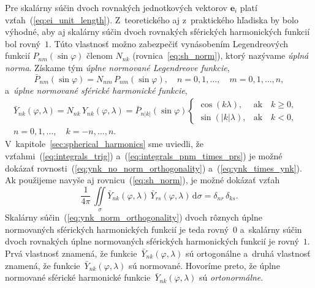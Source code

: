 \documentclass[a4paper, 12pt]{book}
\newcommand{\diff}{\mathrm d}
\let\vec\mathbf
\begin{document}
Pre skalárny súčin dvoch rovnakých jednotkových vektorov $\vec e_i$ platí 
vzťah~(\ref{eq:ei_unit_length}).  Z~teoretického aj z~praktického hľadiska by 
bolo výhodné, aby aj skalárny súčin dvoch rovnakých sférických harmonických 
funkcií bol rovný~$1$.  Túto vlastnosť možno zabezpečiť vynásobením 
Legendreových funkcií $P_{nm}(\sin\varphi)$ členom $N_{nk}$ 
(rovnica~\ref{eq:sh_norm}), ktorý nazývame \emph{úplná norma}.  Získame tým 
\emph{úplne normované Legendreove funkcie},
%
\begin{equation}
\bar{P}_{nm}(\sin\varphi) = N_{nm} \, P_{nm}(\sin\varphi){,} \quad  n = 0, 1, 
\dots,
\quad m = 0, 1, \dots, n{,}
\end{equation}
%
a~\emph{úplne normované sférické harmonické funkcie},
%
\begin{equation}
\label{eq:ynk_norm}
\begin{split}
\bar{Y}_{nk}(\varphi, \lambda) = N_{nk} \, Y_{nk}(\varphi, \lambda)
= \bar{P}_{n|k|}(\sin\varphi)
%
\begin{cases}
\cos(k\lambda){,}    &\text{ak} \quad k \geq 0{,}\\
\sin(|k|\lambda){,}  &\text{ak} \quad k < 0{,}
\end{cases}
&
%
\\
n = 0, 1, \dots, \quad k = -n, \dots, n{.}&
\end{split}
\end{equation}
%
V~kapitole~\ref{sec:spherical_harmonics} sme uviedli, že 
vzťahmi~(\ref{eq:integrals_trig}) a~(\ref{eq:integrals_pnm_times_prs}) je možné 
dokázať rovnosti~(\ref{eq:ynk_no_norm_orthogonality}) 
a~(\ref{eq:ynk_times_ynk}).  Ak použijeme navyše aj rovnicu~(\ref{eq:sh_norm}),  
je možné dokázať vzťah
%
\begin{equation}
\label{eq:ynk_norm_orthogonality}
\frac{1}{4\pi} \, \iint\limits_{\sigma} \bar{Y}_{nk}(\varphi, \lambda) \,
\bar{Y}_{rs}(\varphi, \lambda) \, \diff \sigma = \delta_{nr} \, \delta_{ks}{.}
\end{equation}
%
Skalárny súčin~(\ref{eq:ynk_norm_orthogonality}) dvoch rôznych úplne
normovaných sférických harmonických funkcií je teda rovný~$0$ a~skalárny
súčin dvoch rovnakých úplne normovaných sférických harmonických funkcií je
rovný~$1$.  Prvá vlastnosť znamená, že funkcie~$\bar{Y}_{nk}(\varphi, \lambda)$ 
sú ortogonálne a~druhá vlastnosť znamená, že funkcie~$\bar{Y}_{nk}(\varphi, 
\lambda)$ sú normované.  Hovoríme preto, že úplne normované sférické harmonické 
funkcie~$\bar{Y}_{nk}(\varphi, \lambda)$ sú \emph{ortonormálne}.
\end{document}
